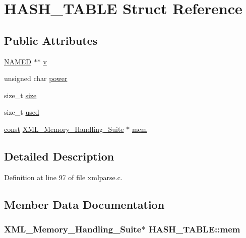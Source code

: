 \hypertarget{struct_h_a_s_h___t_a_b_l_e}{}\section{H\+A\+S\+H\+\_\+\+T\+A\+B\+LE Struct Reference}
\label{struct_h_a_s_h___t_a_b_l_e}
\subsection*{Public Attributes}
\begin{DoxyCompactItemize}
\item 
\hyperlink{struct_n_a_m_e_d}{N\+A\+M\+ED} $\ast$$\ast$ \hyperlink{struct_h_a_s_h___t_a_b_l_e_a3836fe57566c4811985429bb9a8ade9b}{v}
\item 
unsigned char \hyperlink{struct_h_a_s_h___t_a_b_l_e_a4d30d7fa766cca964c0963e9baf55b6e}{power}
\item 
size\+\_\+t \hyperlink{struct_h_a_s_h___t_a_b_l_e_ad99578795ef74ec574a9e88b746fb4a4}{size}
\item 
size\+\_\+t \hyperlink{struct_h_a_s_h___t_a_b_l_e_a7cb555fdf2da3a7b13e2cc70e02b70b5}{used}
\item 
\hyperlink{getopt1_8c_a2c212835823e3c54a8ab6d95c652660e}{const} \hyperlink{struct_x_m_l___memory___handling___suite}{X\+M\+L\+\_\+\+Memory\+\_\+\+Handling\+\_\+\+Suite} $\ast$ \hyperlink{struct_h_a_s_h___t_a_b_l_e_ac8fd3825981f7243d92aec30134b2009}{mem}
\end{DoxyCompactItemize}


\subsection{Detailed Description}


Definition at line 97 of file xmlparse.\+c.



\subsection{Member Data Documentation}
\subsubsection[{\texorpdfstring{mem}{mem}}]{ {\bf X\+M\+L\+\_\+\+Memory\+\_\+\+Handling\+\_\+\+Suite}$\ast$ H\+A\+S\+H\+\_\+\+T\+A\+B\+L\+E\+::mem}\hypertarget{struct_h_a_s_h___t_a_b_l_e_ac8fd3825981f7243d92aec30134b2009}{}\label{struct_h_a_s_h___t_a_b_l_e_ac8fd3825981f7243d92aec30134b2009}


